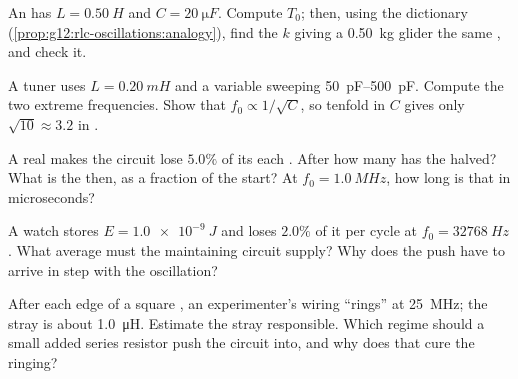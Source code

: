 \begin{exercise}[$\star\star$]\label{exo:g12:rlc-oscillations:11}
An  has $L = \qty{0.50}{H}$ and $C = \qty{20}{\micro F}$.
Compute $T_0$; then, using the dictionary
(\cref{prop:g12:rlc-oscillations:analogy}), find the  $k$
giving a \qty{0.50}{kg} glider the same , and check it.
\end{exercise}

\begin{exercise}[$\star\star\star$]\label{exo:g12:rlc-oscillations:12}
A tuner uses $L = \qty{0.20}{mH}$ and a variable  sweeping
\qtyrange{50}{500}{pF}. Compute the two extreme frequencies. Show that
$f_0 \propto 1/\sqrt{C}$, so tenfold in $C$ gives only
$\sqrt{10} \approx 3.2$ in .
\end{exercise}

\begin{exercise}[$\star\star\star$]\label{exo:g12:rlc-oscillations:13}
A real  makes the circuit lose $5.0\%$ of its  each
. After how many  has the  halved? What is
the  then, as a fraction of the start? At
$f_0 = \qty{1.0}{MHz}$, how long is that in microseconds?
\end{exercise}

\begin{exercise}[$\star\star\star$]\label{exo:g12:rlc-oscillations:14}
A watch  stores $E = \qty{1.0e-9}{J}$ and loses $2.0\%$ of
it per cycle at $f_0 = \qty{32768}{Hz}$. What average  must the
maintaining circuit supply? Why does the push have to arrive in step
with the oscillation?
\end{exercise}

\begin{exercise}[$\star\star\star$]\label{exo:g12:rlc-oscillations:15}
After each edge of a square , an experimenter's wiring ``rings''
at \qty{25}{MHz}; the stray  is about \qty{1.0}{\micro H}.
Estimate the stray  responsible. Which regime should a
small added series resistor push the circuit into, and why does that
cure the ringing?
\end{exercise}

